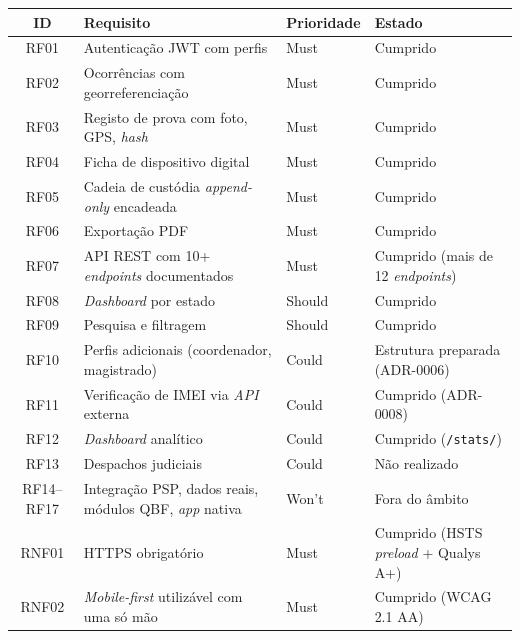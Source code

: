 \begin{longtable}{@{}cL{8.5cm}L{2.0cm}L{2.5cm}@{}}
\toprule
\textbf{ID} & \textbf{Requisito} & \textbf{Prioridade} & \textbf{Estado} \\
\midrule
\endhead
RF01 & Autenticação JWT com perfis                       & Must  & Cumprido \\
RF02 & Ocorrências com georreferenciação                 & Must  & Cumprido \\
RF03 & Registo de prova com foto, GPS, \emph{hash}       & Must  & Cumprido \\
RF04 & Ficha de dispositivo digital                       & Must  & Cumprido \\
RF05 & Cadeia de custódia \emph{append-only} encadeada    & Must  & Cumprido \\
RF06 & Exportação PDF                                     & Must  & Cumprido \\
RF07 & API REST com 10+ \emph{endpoints} documentados     & Must  & Cumprido (mais de 12 \emph{endpoints}) \\
RF08 & \emph{Dashboard} por estado                        & Should & Cumprido \\
RF09 & Pesquisa e filtragem                               & Should & Cumprido \\
RF10 & Perfis adicionais (coordenador, magistrado)        & Could & Estrutura preparada (ADR-0006) \\
RF11 & Verificação de IMEI via \emph{API} externa         & Could & Cumprido (ADR-0008) \\
RF12 & \emph{Dashboard} analítico                         & Could & Cumprido (\texttt{/stats/}) \\
RF13 & Despachos judiciais                                & Could & Não realizado \\
RF14--RF17 & Integração PSP, dados reais, módulos QBF, \emph{app} nativa & Won't & Fora do âmbito \\
\midrule
RNF01 & HTTPS obrigatório                                 & Must  & Cumprido (HSTS \emph{preload} + Qualys A+) \\
RNF02 & \emph{Mobile-first} utilizável com uma só mão      & Must  & Cumprido (WCAG 2.1 AA) \\

\end{longtable}
